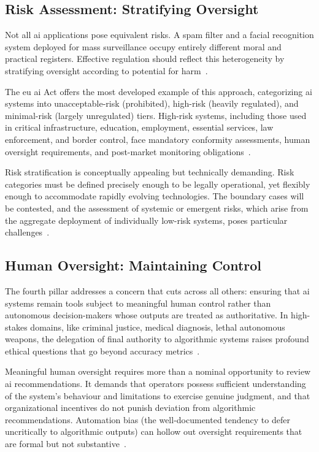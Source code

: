 \documentclass[11pt,showkeys]{essay}
\begin{document}
\subsection{Risk Assessment: Stratifying Oversight}

Not all \gls{ai} applications pose equivalent risks. A spam filter and a facial recognition system deployed for mass surveillance occupy entirely different moral and practical registers. Effective regulation should reflect this heterogeneity by stratifying oversight according to potential for harm~\cite{eu_proposal_2021}.

The \gls{eu} \gls{ai} Act offers the most developed example of this approach, categorizing \gls{ai} systems into unacceptable-risk (prohibited), high-risk (heavily regulated), and minimal-risk (largely unregulated) tiers. High-risk systems, including those used in critical infrastructure, education, employment, essential services, law enforcement, and border control, face mandatory conformity assessments, human oversight requirements, and post-market monitoring obligations~\cite{eu_proposal_2021}.

Risk stratification is conceptually appealing but technically demanding. Risk categories must be defined precisely enough to be legally operational, yet flexibly enough to accommodate rapidly evolving technologies. The boundary cases will be contested, and the assessment of systemic or emergent risks, which arise from the aggregate deployment of individually low-risk systems, poses particular challenges~\cite{dafoe_ai_2018}.

\subsection{Human Oversight: Maintaining Control}

The fourth pillar addresses a concern that cuts across all others: ensuring that \gls{ai} systems remain tools subject to meaningful human control rather than autonomous decision-makers whose outputs are treated as authoritative. In high-stakes domains, like criminal justice, medical diagnosis, lethal autonomous weapons, the delegation of final authority to algorithmic systems raises profound ethical questions that go beyond accuracy metrics~\cite{floridi_ai4people_2018}.

Meaningful human oversight requires more than a nominal opportunity to review \gls{ai} recommendations. It demands that operators possess sufficient understanding of the system's behaviour and limitations to exercise genuine judgment, and that organizational incentives do not punish deviation from algorithmic recommendations. Automation bias (the well-documented tendency to defer uncritically to algorithmic outputs) can hollow out oversight requirements that are formal but not substantive~\cite{veale_fairness_2018}.
\end{document}
